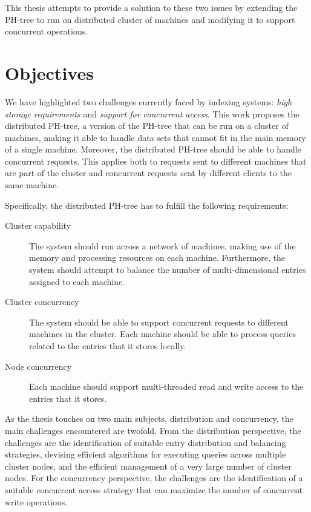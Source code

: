\documentclass[11pt,a4paper]{globis-book}
\begin{document}
This thesis attempts to provide a solution to these two issues by extending the PH-tree to run on distributed cluster of machines and modifying it to support concurrent operations.

\section{Objectives}
\label{sec:intro-objectives}
We have highlighted two challenges currently faced by indexing systems: \textit{high storage requirements} and \textit{support for concurrent access}. This work proposes the distributed PH-tree, a version of the PH-tree that can be run on a cluster of machines, making it able to handle data sets that cannot fit in the main memory of a single machine. Moreover, the distributed PH-tree should be able to handle concurrent requests. This applies both to requests sent to different machines that are part of the cluster and concurrent requests sent by different clients to the same machine. 

Specifically, the distributed PH-tree has to fulfill the following requirements:
\begin{description}
    \item[Cluster capability] The system should run across a network of machines, making use of the memory and processing resources on each machine. Furthermore, the system should attempt to balance the number of multi-dimensional entries assigned to each machine.
    \item[Cluster concurrency] The system should be able to support concurrent requests to different machines in the cluster. Each machine should be able to process queries related to the entries that it stores locally.
    \item[Node concurrency] Each machine should support multi-threaded read and write access to the entries that it stores.
\end{description} 

As the thesis touches on two main subjects, distribution and concurrency, the main challenges encountered are twofold. From the distribution perspective, the challenges are the identification of suitable entry distribution and balancing strategies, devising efficient algorithms for executing queries across multiple cluster nodes, and the efficient management of a very large number of cluster nodes. For the concurrency perspective, the challenges are the identification of a suitable concurrent access strategy that can maximize the number of concurrent write operations.
\end{document}
